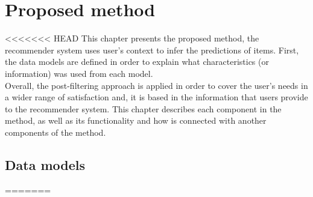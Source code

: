 \chapter{Proposed method}\label{method}

<<<<<<< HEAD
This chapter presents the proposed method, the recommender system uses
user's context to infer the predictions of items.  First, the data
models are defined in order to explain what characteristics (or
information) was used from each model. \\Overall, the post-filtering
approach is applied in order to cover the user's needs in a wider
range of satisfaction and, it is based in the information that users
provide to the recommender system. This chapter describes each
component in the method, as well as its functionality and how is
connected with another components of the method.

\section{Data models} 
=======




